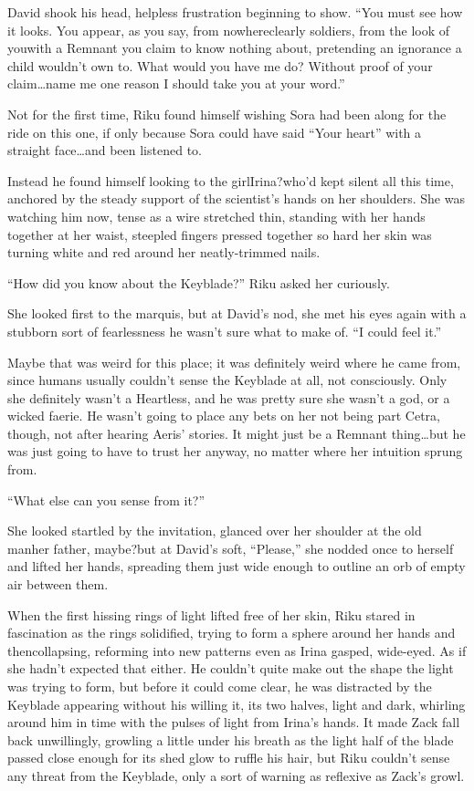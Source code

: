 David shook his head, helpless frustration beginning to show. ``You must see how it looks. You appear, as you say, from nowhere\textemdash clearly soldiers, from the look of you\textemdash with a Remnant you claim to know nothing about, pretending an ignorance a child wouldn't own to. What would you have me do? Without proof of your claim\ldots name me one reason I should take you at your word.''

Not for the first time, Riku found himself wishing Sora had been along for the ride on this one, if only because Sora could have said ``Your heart'' with a straight face\ldots and been listened to.

Instead he found himself looking to the girl\textemdash Irina?\textemdash who'd kept silent all this time, anchored by the steady support of the scientist's hands on her shoulders. She was watching him now, tense as a wire stretched thin, standing with her hands together at her waist, steepled fingers pressed together so hard her skin was turning white and red around her neatly-trimmed nails.

``How did you know about the Keyblade?'' Riku asked her curiously.

She looked first to the marquis, but at David's nod, she met his eyes again with a stubborn sort of fearlessness he wasn't sure what to make of. ``I could feel it.''

Maybe that was weird for this place; it was definitely weird where he came from, since humans usually couldn't sense the Keyblade at all, not consciously. Only she definitely wasn't a Heartless, and he was pretty sure she wasn't a god, or a wicked faerie. He wasn't going to place any bets on her not being part Cetra, though, not after hearing Aeris' stories. It might just be a Remnant thing\ldots but he was just going to have to trust her anyway, no matter where her intuition sprung from.

``What else can you sense from it?''

She looked startled by the invitation, glanced over her shoulder at the old man\textemdash her father, maybe?\textemdash but at David's soft, ``Please,'' she nodded once to herself and lifted her hands, spreading them just wide enough to outline an orb of empty air between them.

When the first hissing rings of light lifted free of her skin, Riku stared in fascination as the rings solidified, trying to form a sphere around her hands and then\textemdash collapsing, reforming into new patterns even as Irina gasped, wide-eyed. As if she hadn't expected that either. He couldn't quite make out the shape the light was trying to form, but before it could come clear, he was distracted by the Keyblade appearing without his willing it, its two halves, light and dark, whirling around him in time with the pulses of light from Irina's hands. It made Zack fall back unwillingly, growling a little under his breath as the light half of the blade passed close enough for its shed glow to ruffle his hair, but Riku couldn't sense any threat from the Keyblade, only a sort of warning as reflexive as Zack's growl.

